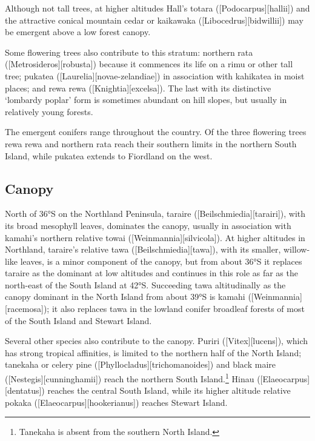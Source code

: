 Although not tall trees, at higher altitudes Hall's totara ([Podocarpus][hallii]) and the attractive conical mountain cedar or kaikawaka ([Libocedrus][bidwillii]) may be emergent above a low forest canopy.

Some flowering trees also contribute to this stratum: northern rata ([Metrosideros][robusta]) because it commences its life on a rimu or other tall tree; pukatea ([Laurelia][novae-zelandiae]) in association with kahikatea in moist places; and rewa rewa ([Knightia][excelsa]).
The last with its distinctive `lombardy poplar' form is sometimes abundant on hill slopes, but usually in relatively young forests.

The emergent conifers range throughout the country.
Of the three flowering trees rewa rewa and northern rata reach their southern limits in the northern South Island, while pukatea extends to Fiordland on the west.

\subsection{Canopy}

North of 36°S on the Northland Peninsula, taraire ([Beilschmiedia][tarairi]), with its broad mesophyll leaves, dominates the canopy, usually in association with kamahi's northern relative towai ([Weinmannia][silvicola]).
At higher altitudes in Northland, taraire's relative tawa ([Beilschmiedia][tawa]), with its smaller, willow-like leaves, is a minor component of the canopy, but from about 36°S it replaces taraire as the dominant at low altitudes and continues in this role as far as the north-east of the South Island at 42°S.
Succeeding tawa altitudinally as the canopy dominant in the North Island from about 39°S is kamahi ([Weinmannia][racemosa]); it also replaces tawa in the lowland conifer broadleaf forests of most of the South Island and Stewart Island.

Several other species also contribute to the canopy.
Puriri ([Vitex][lucens]), which has strong tropical affinities, is limited to the northern half of the North Island; tanekaha or celery pine ([Phyllocladus][trichomanoides]) and black maire ([Nestegis][cunninghamii]) reach the northern South Island.\footnote{Tanekaha is absent from the southern North Island.}
Hinau ([Elaeocarpus][dentatus]) reaches the central South Island, while its higher altitude relative pokaka ([Elaeocarpus][hookerianus]) reaches Stewart Island.


